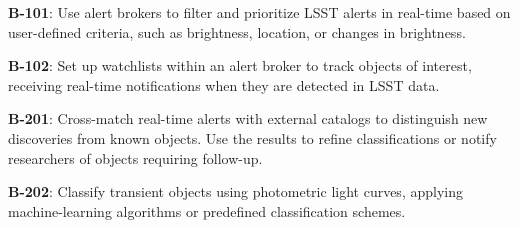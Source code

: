 \textbf{B-101}: Use alert brokers to filter and prioritize LSST alerts in real-time based on user-defined criteria, such as brightness, location, or changes in brightness.

\textbf{B-102}: Set up watchlists within an alert broker to track objects of interest, receiving real-time notifications when they are detected in LSST data.

\textbf{B-201}: Cross-match real-time alerts with external catalogs to distinguish new discoveries from known objects.
Use the results to refine classifications or notify researchers of objects requiring follow-up.

\textbf{B-202}: Classify transient objects using photometric light curves, applying machine-learning algorithms or predefined classification schemes.
